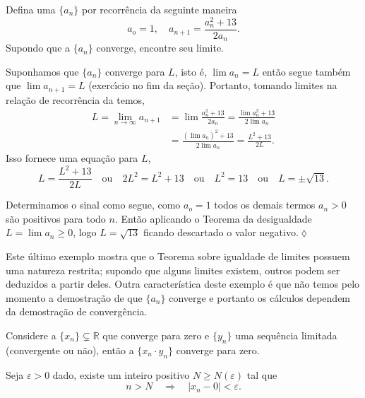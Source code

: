 \begin{exer}
Defina uma \seq $\{a_n\}$ por recorr\^{e}ncia da seguinte maneira
\begin{equation*}
    a_o=1,\quad a_{n+1}=\frac{a_n^2+13}{2a_n}.
\end{equation*}
Supondo que a \seq $\{a_n\}$ converge, encontre seu limite.
\end{exer}

\solo Suponhamos que $\{a_n\}$ converge para $L$, isto \'{e}, $\lim
a_n=L$ ent\~{a}o segue tamb\'{e}m que $\lim a_{n+1}=L$ (exerc\'{\i}cio no fim da
se\c{c}\~{a}o). Portanto, tomando limites na rela\c{c}\~{a}o de recorr\^{e}ncia da \seq
temos,
\begin{align*}
    L=\lim_{n\to\infty}a_{n+1}&=\lim\frac{a_n^2+13}{2a_n}=
    \frac{\lim a_n^2+13 }{2\lim a_n}\\[2ex]
   &=\frac{(\lim a_n)^2+13 }{2\lim a_n}=\frac{L^2+13}{2L}.
\end{align*}
Isso fornece uma equa\c{c}\~{a}o para $L$,
\begin{equation*}
    L=\frac{L^2+13}{2L}\quad\text{ou}\quad
    2L^2=L^2+13\quad\text{ou}\quad L^2=13\quad\text{ou}\quad
    L=\pm\sqrt{13}.
\end{equation*}

Determinamos o sinal como segue, como $a_o=1$ todos os demais termos
$a_n>0$ s\~{a}o positivos para todo $n$. Ent\~{a}o aplicando o Teorema da
desigualdade $L=\lim a_n\geq 0$, logo $L=\sqrt{13}$ ficando
descartado o valor negativo.\hfill \(\lozenge\)

Este \'{u}ltimo exemplo mostra que o Teorema sobre igualdade de limites
possuem uma natureza restrita; supondo que alguns limites existem,
outros podem ser deduzidos a partir deles. Outra característica
deste exemplo \'{e} que n\~{a}o temos pelo momento a demostra\c{c}\~{a}o de que
$\{a_n\}$ converge e portanto os cálculos dependem da demostra\c{c}\~{a}o de
converg\^{e}ncia.


\begin{fteo}
Considere a \seq $\{x_n\}\subsetneq \mathbb{R}$ que converge para zero e $\{y_n\}$ 
uma sequência limitada (convergente ou não), ent\~{a}o a \seq $\{x_n\cdot y_n\}$ converge para zero.
\end{fteo}

\prova Seja $\varepsilon>0$ dado, existe um inteiro positivo $N\geq N(\varepsilon)$  tal que
\begin{equation*}
    n>N \quad \Rightarrow\quad |x_n-0|<\varepsilon.
\end{equation*}

